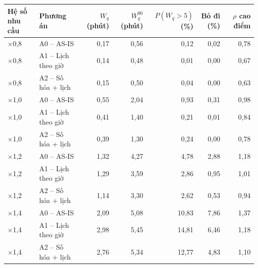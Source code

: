 \begin{tabular}{llrrrrr}
\toprule
\textbf{Hệ số nhu cầu} & \textbf{Phương án} & \textbf{$W_q$ (phút)} & \textbf{$W_q^{90}$ (phút)} & \textbf{$P(W_q{>}5)$ (\%)} & \textbf{Bỏ đi (\%)} & \textbf{$\rho$ cao điểm} \\
\midrule
$\times$0{,}8 & A0 – AS-IS & 0{,}17 & 0{,}56 & 0{,}12 & 0{,}02 & 0{,}78 \\
$\times$0{,}8 & A1 – Lịch theo giờ & 0{,}14 & 0{,}48 & 0{,}01 & 0{,}00 & 0{,}67 \\
$\times$0{,}8 & A2 – Số hóa + lịch & 0{,}15 & 0{,}50 & 0{,}04 & 0{,}00 & 0{,}63 \\
$\times$1{,}0 & A0 – AS-IS & 0{,}55 & 2{,}04 & 0{,}93 & 0{,}31 & 0{,}98 \\
$\times$1{,}0 & A1 – Lịch theo giờ & 0{,}41 & 1{,}40 & 0{,}21 & 0{,}01 & 0{,}84 \\
$\times$1{,}0 & A2 – Số hóa + lịch & 0{,}39 & 1{,}30 & 0{,}24 & 0{,}00 & 0{,}78 \\
$\times$1{,}2 & A0 – AS-IS & 1{,}32 & 4{,}27 & 4{,}78 & 2{,}88 & 1{,}18 \\
$\times$1{,}2 & A1 – Lịch theo giờ & 1{,}29 & 3{,}59 & 2{,}86 & 0{,}95 & 1{,}01 \\
$\times$1{,}2 & A2 – Số hóa + lịch & 1{,}14 & 3{,}30 & 2{,}62 & 0{,}53 & 0{,}94 \\
$\times$1{,}4 & A0 – AS-IS & 2{,}09 & 5{,}08 & 10{,}83 & 7{,}86 & 1{,}37 \\
$\times$1{,}4 & A1 – Lịch theo giờ & 2{,}98 & 5{,}45 & 14{,}81 & 6{,}46 & 1{,}18 \\
$\times$1{,}4 & A2 – Số hóa + lịch & 2{,}76 & 5{,}34 & 12{,}77 & 4{,}83 & 1{,}10 \\
\bottomrule
\end{tabular}
